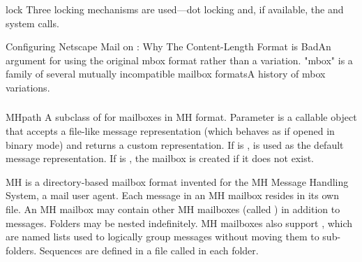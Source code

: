 \begin{methoddesc}{lock}{}
Three locking mechanisms are used---dot locking and, if available, the
 and  system calls.
\end{methoddesc}

\begin{seealso}
    {Configuring Netscape Mail on \UNIX{}: Why The Content-Length Format is
    Bad}{An argument for using the original mbox format rather than a
    variation.}
    {"mbox" is a family of several mutually incompatible mailbox formats}{A
    history of mbox variations.}
\end{seealso}

\subsubsection{}
\label{mailbox-mh}

\begin{classdesc}{MH}{path}
A subclass of  for mailboxes in MH format. Parameter
 is a callable object that accepts a file-like message
representation (which behaves as if opened in binary mode) and returns a custom
representation. If  is ,  is used as
the default message representation. If  is , the mailbox
is created if it does not exist.
\end{classdesc}

MH is a directory-based mailbox format invented for the MH Message Handling
System, a mail user agent. Each message in an MH mailbox resides in its own
file. An MH mailbox may contain other MH mailboxes (called ) in
addition to messages. Folders may be nested indefinitely. MH mailboxes also
support , which are named lists used to logically group messages
without moving them to sub-folders. Sequences are defined in a file called
 in each folder.

